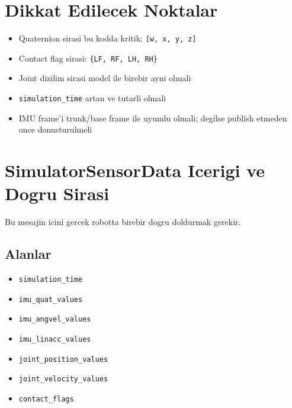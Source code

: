 \documentclass[11pt,a4paper]{article}
\begin{document}
\section*{Dikkat Edilecek Noktalar}
\begin{itemize}
  \item Quaternion sirasi bu kodda kritik: \texttt{[w, x, y, z]}
  \item Contact flag sirasi: \texttt{\{LF, RF, LH, RH\}}
  \item Joint dizilim sirasi model ile birebir ayni olmali
  \item \texttt{simulation\_time} artan ve tutarli olmali
  \item IMU frame'i trunk/base frame ile uyumlu olmali; degilse publish etmeden once donusturulmeli
\end{itemize}

\section*{SimulatorSensorData Icerigi ve Dogru Sirasi}
Bu mesajin icini gercek robotta birebir dogru doldurmak gerekir.

\subsection*{Alanlar}
\begin{itemize}
  \item \texttt{simulation\_time}
  \item \texttt{imu\_quat\_values}
  \item \texttt{imu\_angvel\_values}
  \item \texttt{imu\_linacc\_values}
  \item \texttt{joint\_position\_values}
  \item \texttt{joint\_velocity\_values}
  \item \texttt{contact\_flags}
\end{itemize}
\end{document}
